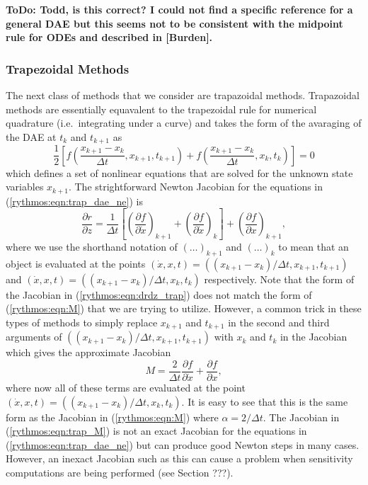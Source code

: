 \documentclass[pdf,ps2pdf,11pt]{SANDreport}
\begin{document}
{}\textbf{ToDo: Todd, is this correct?  I could not find a specific reference
for a general DAE but this seems not to be consistent with the midpoint rule
for ODEs and described in [Burden].}

\subsubsection{Trapezoidal Methods}

The next class of methods that we consider are trapazoidal methods.
Trapazoidal methods are essentially equavalent to the trapezoidal rule for
numerical quadrature (i.e.\ integrating under a curve) and takes the form of
the avaraging of the DAE at $t_k$ and $t_{k+1}$ as
%
\begin{equation}
\frac{1}{2} \left[
f\left( \frac{x_{k+1} - x_{k}}{\Delta t}, x_{k+1} , t_{k+1} \right)
+ f\left( \frac{x_{k+1} - x_{k}}{\Delta t}, x_k , t_k \right)
\right]
 = 0
\label{rythmos:eqn:trap_dae_ne}
\end{equation}
%
which defines a set of nonlinear equations that are solved for the unknown
state variables $x_{k+1}$.  The strightforward Newton Jacobian for the
equations in (\ref{rythmos:eqn:trap_dae_ne}) is
%
\begin{equation}
\frac{\partial r}{\partial z}
= \frac{1}{\Delta t} \left[
\left( \frac{\partial f}{\partial \dot{x}} \right)_{k+1}
+ \left( \frac{\partial f}{\partial \dot{x}} \right)_{k}
\right]
+ \left( \frac{\partial f}{\partial x} \right)_{k+1},
\label{rythmos:eqn:drdz_trap}
\end{equation}
%
where we use the shorthand notation of $(\ldots)_{k+1}$ and $(\ldots)_k$ to
mean that an object is evaluated at the points $(\dot{x},x,t) =
((x_{k+1}-x_k)/\Delta t, x_{k+1}, t_{k+1})$ and $(\dot{x},x,t) =
((x_{k+1}-x_k)/\Delta t, x_k, t_k)$ respectively.  Note that the form of the
Jacobian in (\ref{rythmos:eqn:drdz_trap}) does not match the form of
(\ref{rythmos:eqn:M}) that we are trying to utilize.  However, a common trick
in these types of methods to simply replace $x_{k+1}$ and $t_{k+1}$ in the
second and third arguments of $((x_{k+1}-x_k)/\Delta t, x_{k+1}, t_{k+1})$
with $x_k$ and $t_k$ in the Jacobian which gives the approximate Jacobian
%
\begin{equation}
M
= \frac{2}{\Delta t} \frac{\partial f}{\partial \dot{x}}
+ \frac{\partial f}{\partial x},
\label{rythmos:eqn:trap_M}
\end{equation}
%
where now all of these terms are evaluated at the point $(\dot{x},x,t) =
((x_{k+1}-x_k)/\Delta t, x_k, t_k)$.  It is easy to see that this is the same
form as the Jacobian in (\ref{rythmos:eqn:M}) where $\alpha = 2/\Delta t$.
The Jacobian in (\ref{rythmos:eqn:trap_M}) is not an exact Jacobian for the
equations in (\ref{rythmos:eqn:trap_dae_ne}) but can produce good Newton steps
in many cases.  However, an inexact Jacobian such as this can cause a problem
when sensitivity computations are being performed (see Section ???).
\end{document}
